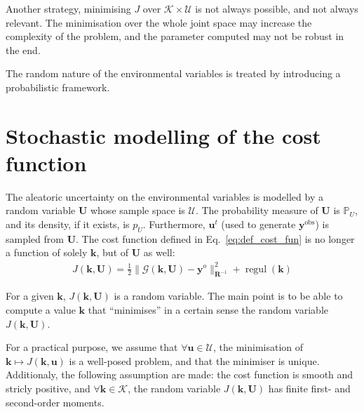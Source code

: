 \documentclass[npg, manuscript]{copernicus}
\newcommand{\yobs}{\mathbf{y}^o}
\newcommand{\Prob}{\mathbb{P}}
\begin{document}
Another strategy, minimising $J$ over $\mathcal{K}\times\mathcal{U}$ is not always possible, and not always relevant. The minimisation over the whole joint space may increase the complexity of the problem, and the parameter computed may not be robust in the end. 

The random nature of the environmental variables is treated by introducing a probabilistic framework.


\section{Stochastic modelling of the cost function}
The aleatoric uncertainty on the environmental variables is modelled by a random variable $\mathbf{U}$ whose sample space is $\mathcal{U}$. The probability measure of $\mathbf{U}$ is $\Prob_U$, and its density, if it exists, is $p_U$. Furthermore, $\mathbf{u}^t$ (used to generate $\mathbf{y}^{\mathrm{obs}}$) is sampled from $\mathbf{U}$.
The cost function defined in Eq.~\eqref{eq:def_cost_fun} is no longer a function of solely $\mathbf{k}$, but of $\mathbf{U}$ as well:
\begin{align}
  \label{eq:def_cost_fun_rnd}
  J(\mathbf{k},\mathbf{U}) = \frac12 \| \mathcal{G}(\mathbf{k},\mathbf{U}) - \yobs \|^2_{\mathbf{R}^{-1}} + \mathop{\mathrm{regul}}(\mathbf{k})
\end{align}

For a given $\mathbf{k}$, $J(\mathbf{k},\mathbf{U})$ is a random variable. The main point is to be able to compute a value $\mathbf{k}$ that ``minimises'' in a certain sense the random variable $J(\mathbf{k},\mathbf{U})$.

For a practical purpose, we assume that $\forall \mathbf{u}\in\mathcal{U}$, the minimisation of $\mathbf{k}\mapsto J(\mathbf{k},\mathbf{u})$ is a well-posed problem, and that the minimiser is unique.
Additionaly, the following assumption are made: the cost function is smooth and stricly positive, and $\forall \mathbf{k}\in\mathcal{K}$, the random variable $J(\mathbf{k},\mathbf{U})$ has finite first- and second-order moments.
\end{document}
